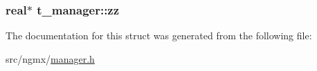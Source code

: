 \hypertarget{structt__manager_a37bbd19cd371c96eb9764d79a87bbcf6}{
\subsubsection[{zz}]{\setlength{\rightskip}{0pt plus 5cm}real$\ast$ {\bf t\-\_\-manager\-::zz}}}\label{structt__manager_a37bbd19cd371c96eb9764d79a87bbcf6}


\-The documentation for this struct was generated from the following file\-:\begin{DoxyCompactItemize}
\item 
src/ngmx/\hyperlink{manager_8h}{manager.\-h}\end{DoxyCompactItemize}
